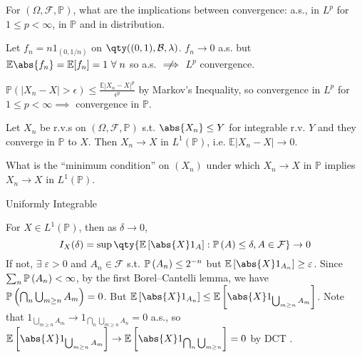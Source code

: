 For $(\Omega, \mathcal{F}, \mathbb{P})$, what are the implications between convergence: a.s., in $L^p$ for $1 \leq p < \infty$, in $\mathbb{P}$ and in distribution.

Let $f_n = n 1_{(0, 1/n)}$ on $\qty((0, 1), \mathcal{B}, \lambda)$.
$f_n \to 0$ a.s. but $\mathbb{E}\abs{f_n} = \mathbb{E}[f_n] = 1 \ \forall \; n$ so a.s. $\centernot\implies$ $L^p$ convergence.

$\mathbb{P}(|X_n - X| > \epsilon) \leq \frac{\mathbb{E}|X_n - X|^p}{\epsilon^p}$ by Markov's Inequality, so convergence in $L^p$ for $1 \leq p < \infty \implies$ convergence in $\mathbb{P}$.

\begin{theorem}
	Let $X_n$ be r.v.s on $(\Omega, \mathcal F, \mathbb P)$ s.t. $\abs{X_n} \leq Y$ for integrable r.v. $Y$ and they converge in $\mathbb{P}$ to $X$.
	Then $X_n \to X$ in $L^1(\mathbb P)$, i.e. $\mathbb{E}|X_n - X| \to 0$.
\end{theorem}

\begin{question}
	What is the ``minimum condition'' on $(X_n)$ under which $X_n \to X$ in $\mathbb{P}$ implies $X_n \to X$ in $L^1(\mathbb{P})$.
\end{question}

\begin{answer}
	Uniformly Integrable
\end{answer}


For $X \in L^1(\mathbb P)$, then as $\delta \to 0$,
\[ I_X(\delta) = \sup \qty{ \expect{\abs{X} 1_A} : \prob{A} \leq \delta, A \in \mathcal{F}} \to 0 \]
If not, $\exists \; \varepsilon > 0$ and $A_n \in \mathcal F$ s.t. $\mathbb{P}\left({A_n}\right) \leq 2^{-n}$ but $\expect{\abs{X} 1_{A_n}} \geq \varepsilon$.
Since $\sum_n \mathbb{P}\left({A_n}\right) < \infty$, by the first Borel--Cantelli lemma, we have $\mathbb{P}\left({\bigcap_n \bigcup_{m \geq n} A_m}\right) = 0$.
But $\expect{\abs{X} 1_{A_n}} \leq \expect{\abs{X} 1_{\bigcup_{m \geq n} A_m}}$.
Note that $1_{\bigcup_{m \geq n} A_m} \to 1_{\bigcap_n \bigcup_{m \geq n} A_n} = 0$ a.s., so $\expect{\abs{X} 1_{\bigcup_{m \geq n} A_m}} \to \expect{\abs{X} 1_{\bigcap_n \bigcup_{m \geq n}}} = 0$ by DCT \Lightning.

